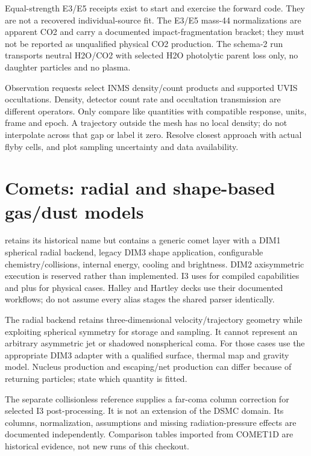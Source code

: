 Equal-strength E3/E5 receipts exist to start and exercise the forward code.
They are not a recovered individual-source fit. The E3/E5 mass-44
normalizations are apparent CO2 and carry a documented impact-fragmentation
bracket; they must not be reported as unqualified physical CO2 production.
The schema-2 run transports neutral H2O/CO2 with selected H2O photolytic
parent loss only, no daughter particles and no plasma.

Observation requests select INMS density/count products and supported UVIS
occultations. Density, detector count rate and occultation transmission are
different operators. Only compare like quantities with compatible response,
units, frame and epoch. A trajectory outside the mesh has no local density;
do not interpolate across that gap or label it zero. Resolve closest approach
with actual flyby cells, and plot sampling uncertainty and data availability.

\section{Comets: radial and shape-based gas/dust models}
 retains its historical name but contains a generic comet
layer with a DIM1 spherical radial backend, legacy DIM3 shape application,
configurable chemistry/collisions, internal energy, cooling and brightness.
DIM2 axisymmetric execution is reserved rather than implemented. I3 uses
 for compiled capabilities and  plus
 for physical cases. Halley and Hartley decks use their
documented workflows; do not assume every alias stages the shared parser
identically.

The radial backend retains three-dimensional velocity/trajectory geometry
while exploiting spherical symmetry for storage and sampling. It cannot
represent an arbitrary asymmetric jet or shadowed nonspherical coma.
For those cases use the appropriate DIM3 adapter with a qualified surface,
thermal map and gravity model. Nucleus production and escaping/net production
can differ because of returning particles; state which quantity is fitted.

The separate collisionless reference supplies a far-coma column correction
for selected I3 post-processing. It is not an extension of the DSMC domain.
Its columns, normalization, assumptions and missing radiation-pressure effects
are documented independently. Comparison tables imported from COMET1D are
historical evidence, not new runs of this checkout.

